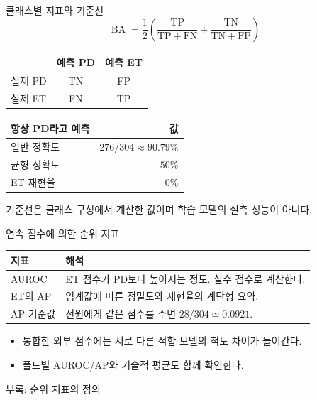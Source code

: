 \documentclass[aspectratio=169,11pt]{beamer}
\newcommand{\code}[1]{\texttt{\detokenize{#1}}}
\newcommand{\src}[1]{\par\vfill{\scriptsize\color{gray}#1}\par}
\DeclareMathOperator{\BA}{BA}
\begin{document}
\begin{frame}[t]{클래스별 지표와 기준선}
\[
 \BA=\frac12\left(
 \frac{\mathrm{TP}}{\mathrm{TP}+\mathrm{FN}}+
 \frac{\mathrm{TN}}{\mathrm{TN}+\mathrm{FP}}\right)
\]
\begin{center}\small
\begin{tabular}{@{}lcc@{}}
\toprule & 예측 PD & 예측 ET\\ \midrule
실제 PD & TN & FP\\
실제 ET & FN & TP\\ \bottomrule
\end{tabular}
\qquad
\begin{tabular}{@{}lr@{}}
\toprule 항상 PD라고 예측 & 값\\ \midrule
일반 정확도 & \(276/304\approx90.79\%\)\\
균형 정확도 & \(50\%\)\\
ET 재현율 & \(0\%\)\\ \bottomrule
\end{tabular}
\end{center}
\src{기준선은 클래스 구성에서 계산한 값이며 학습 모델의 실측 성능이 아니다.}
\end{frame}

\begin{frame}[t]{연속 점수에 의한 순위 지표}
\begin{tabularx}{\linewidth}{@{}lX@{}}
\toprule 지표 & 해석\\ \midrule
AUROC & ET 점수가 PD보다 높아지는 정도. 실수 점수로 계산한다.\\
ET의 AP & 임계값에 따른 정밀도와 재현율의 계단형 요약.\\
AP 기준값 & 전원에게 같은 점수를 주면 \(28/304\simeq0.0921\).\\ \bottomrule
\end{tabularx}
\vspace{2mm}
\begin{itemize}
 \item 통합한 외부 점수에는 서로 다른 적합 모델의 척도 차이가 들어간다.
 \item 폴드별 AUROC/AP와 기술적 평균도 함께 확인한다.
\end{itemize}
\src{\hyperlink{ranking-exact}{부록: 순위 지표의 정의}\quad \code{metrics}}
\end{frame}
\end{document}
